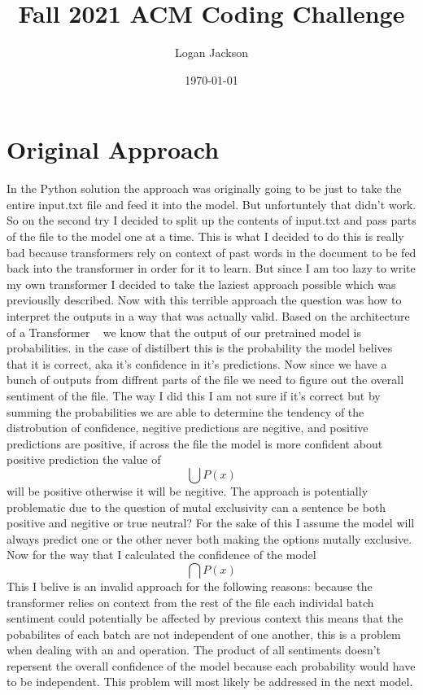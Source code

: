 \documentclass[12pt]{article}
\title{Fall 2021 ACM Coding Challenge}
\author{Logan Jackson}
\date{\today}
\begin{document}
\maketitle{}

\newpage
\section{Original Approach}
In the Python solution the approach was originally going to be just to
take the entire input.txt file and feed it into the model. But unfortuntely
that didn't work. So on the second try I decided to split up the contents
of input.txt and pass parts of the file to the model one at a time. This
is what I decided to do this is really bad because transformers rely on
context of past words in the document to be fed back into the transformer
in order for it to learn. But since I am too lazy to write my own transformer
I decided to take the laziest approach possible which was previouslly described.
Now with this terrible approach the question was how to interpret the outputs
in a way that was actually valid. Based on the architecture of a Transformer ~\cite{opennmt}
we know that the output of our pretrained model is probabilities.
in the case of distilbert this is the probability the 
model belives that it is correct, aka it's confidence in it's predictions.
Now since we have a bunch of outputs from diffrent parts of the file we need to 
figure out the overall sentiment of the file. The way I did this I am not sure
if it's correct but by summing the probabilities we are able to determine the 
tendency of the distrobution of confidence, negitive predictions are negitive,
and positive predictions are positive, if across the file the model is more confident
about positive prediction the value of $$\bigcup{P(x)}$$ will be positive otherwise
it will be negitive. The approach is potentially problematic due to the question of
mutal exclusivity can a sentence be both positive and negitive or true neutral? For the sake
of this I assume the model will always predict one or the other never both making the options 
mutally exclusive.
Now for the way that I calculated the confidence of the model $$\bigcap{P(x)}$$
This I belive is an invalid approach for the following reasons:
because the transformer relies on context from the rest of the file each individal batch
sentiment could potentially be affected by previous context this means that the pobabilites 
of each batch are not independent of one another, this is a problem when dealing with
an and operation. The product of all sentiments doesn't repersent the overall confidence of the 
model because each probability would have to be independent. This problem will most likely be
addressed in the next model.
\end{document}
